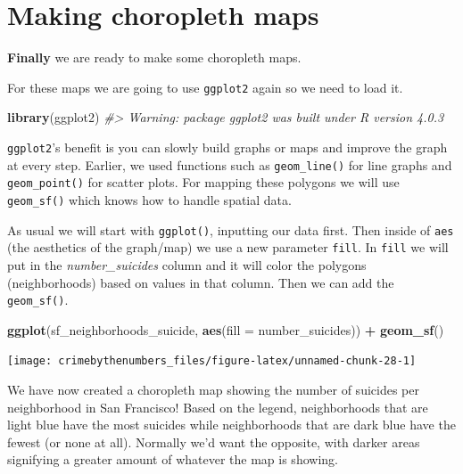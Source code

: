 \documentclass[
  12pt,
]{book}
\newenvironment{Shaded}{\begin{snugshade}}{\end{snugshade}}
\newcommand{\CommentTok}[1]{\textcolor[rgb]{0.37,0.37,0.37}{\textit{#1}}}
\newcommand{\DataTypeTok}[1]{\textcolor[rgb]{0.27,0.27,0.27}{#1}}
\newcommand{\KeywordTok}[1]{\textcolor[rgb]{0.27,0.27,0.27}{\textbf{#1}}}
\newcommand{\NormalTok}[1]{#1}
\newcommand{\OperatorTok}[1]{\textcolor[rgb]{0.43,0.43,0.43}{\textbf{#1}}}
\newcommand{\StringTok}[1]{\textcolor[rgb]{0.5,0.5,0.5}{#1}}
\begin{document}
\hypertarget{making-choropleth-maps}{%
\section{Making choropleth maps}\label{making-choropleth-maps}}

\textbf{Finally} we are ready to make some choropleth maps.

For these maps we are going to use \texttt{ggplot2} again so we need to load it.

\begin{Shaded}
\begin{Highlighting}[]
\KeywordTok{library}\NormalTok{(ggplot2)}
\CommentTok{\#\textgreater{} Warning: package \textquotesingle{}ggplot2\textquotesingle{} was built under R version 4.0.3}
\end{Highlighting}
\end{Shaded}

\texttt{ggplot2}'s benefit is you can slowly build graphs or maps and improve the graph at every step. Earlier, we used functions such as \texttt{geom\_line()} for line graphs and \texttt{geom\_point()} for scatter plots. For mapping these polygons we will use \texttt{geom\_sf()} which knows how to handle spatial data.

As usual we will start with \texttt{ggplot()}, inputting our data first. Then inside of \texttt{aes} (the aesthetics of the graph/map) we use a new parameter \texttt{fill}. In \texttt{fill} we will put in the \emph{number\_suicides} column and it will color the polygons (neighborhoods) based on values in that column. Then we can add the \texttt{geom\_sf()}.

\begin{Shaded}
\begin{Highlighting}[]
\KeywordTok{ggplot}\NormalTok{(sf\_neighborhoods\_suicide, }\KeywordTok{aes}\NormalTok{(}\DataTypeTok{fill =}\NormalTok{ number\_suicides)) }\OperatorTok{+}
\StringTok{  }\KeywordTok{geom\_sf}\NormalTok{() }
\end{Highlighting}
\end{Shaded}

\begin{center}\texttt{[image: crimebythenumbers\_files/figure-latex/unnamed-chunk-28-1]} \end{center}

We have now created a choropleth map showing the number of suicides per neighborhood in San Francisco! Based on the legend, neighborhoods that are light blue have the most suicides while neighborhoods that are dark blue have the fewest (or none at all). Normally we'd want the opposite, with darker areas signifying a greater amount of whatever the map is showing.
\end{document}
